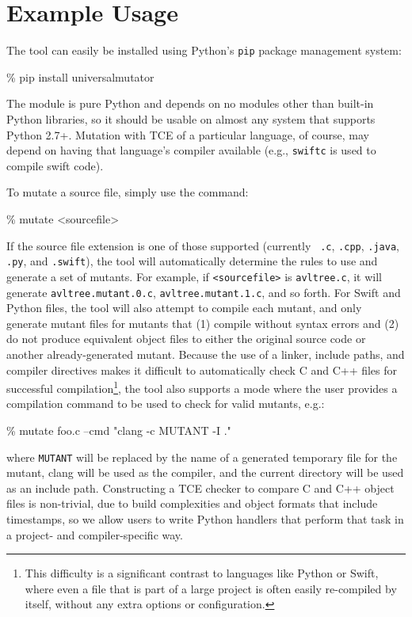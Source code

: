 \section{Example Usage}

The tool can easily be installed using Python's {\tt pip} package management system:

\begin{code}
\% pip install universalmutator
\end{code}

The module is pure Python and depends on no modules other than
built-in Python libraries, so it should be usable on almost any system
that supports Python 2.7+.  Mutation with TCE of a particular
language, of course, may depend on having that language's compiler
available (e.g., {\tt swiftc} is used to compile swift code).

To mutate a source file, simply use the command:


\begin{code}
\% mutate <sourcefile>
\end{code}

If the source file extension is one of those supported (currently {\tt
  .c}, {\tt .cpp}, {\tt .java}, {\tt .py}, and {\tt .swift}), the tool
will automatically determine the rules to use and generate a set of
mutants.  For example, if {\tt <sourcefile>} is {\tt avltree.c}, it
will generate {\tt avltree.mutant.0.c}, {\tt avltree.mutant.1.c}, and
so forth.  For Swift and Python files, the tool will also attempt to
compile each mutant, and only generate mutant files for mutants that
(1) compile without syntax errors and (2) do not produce equivalent
object files to either the original source code or another
already-generated mutant.  Because the use of a linker, include paths, and
compiler directives makes it difficult to automatically check C and
C++ files for successful compilation\footnote{This difficulty is a
  significant contrast to languages
  like Python or Swift, where even a file that is part of a large
  project is often easily re-compiled by itself, without any extra
  options or configuration.}, the tool also supports a mode where the
user provides a compilation command to be used to check for valid
mutants, e.g.:


\begin{code}
\% mutate foo.c --cmd "clang -c MUTANT -I ."
\end{code}

\noindent where {\tt MUTANT} will be replaced by the name of a
generated temporary file for the mutant, clang will be used as the
compiler, and the current directory will be used as an include path.  Constructing a TCE checker
to compare C and C++ object files is non-trivial, due to build
complexities and object formats that include timestamps, so we allow
users to write Python handlers that perform that task in a project- and
compiler-specific way.

